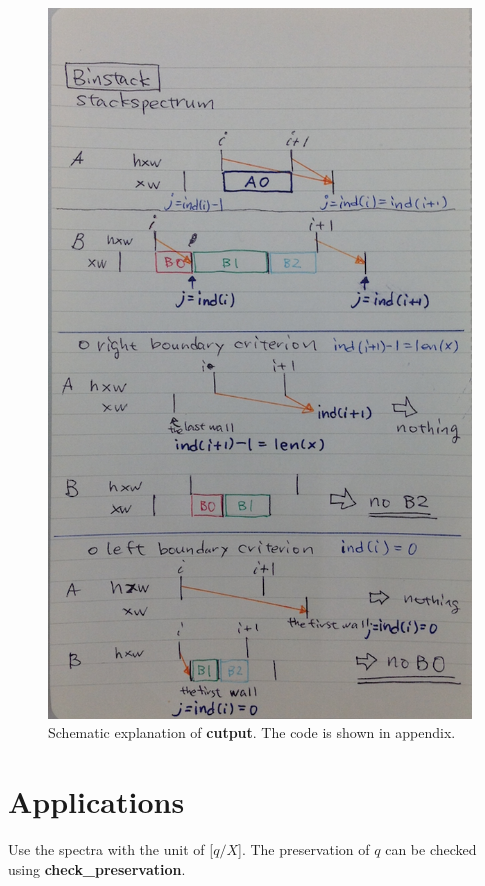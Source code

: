\documentclass[iop, twocolumn, tighten]{emulateapj}
\begin{document}
\begin{figure}[]
  \includegraphics[bb=0 0 615 1030,width=\linewidth]{stackspectrum.png}
\caption{Schematic explanation of {\bf cutput}. The code is shown in appendix. \label{fig:ssp}}
\end{figure}

\newpage

\section{Applications}
 Use the spectra with the unit of [$q/X$]. The preservation of $q$ can be checked using {\bf check\_preservation}.
\end{document}
